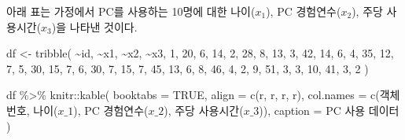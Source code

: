 \documentclass[
]{book}
\newenvironment{Shaded}{\begin{snugshade}}{\end{snugshade}}
\newcommand{\AttributeTok}[1]{\textcolor[rgb]{0.77,0.63,0.00}{#1}}
\newcommand{\ConstantTok}[1]{\textcolor[rgb]{0.00,0.00,0.00}{#1}}
\newcommand{\DecValTok}[1]{\textcolor[rgb]{0.00,0.00,0.81}{#1}}
\newcommand{\FunctionTok}[1]{\textcolor[rgb]{0.00,0.00,0.00}{#1}}
\newcommand{\NormalTok}[1]{#1}
\newcommand{\OtherTok}[1]{\textcolor[rgb]{0.56,0.35,0.01}{#1}}
\newcommand{\SpecialCharTok}[1]{\textcolor[rgb]{0.00,0.00,0.00}{#1}}
\newcommand{\StringTok}[1]{\textcolor[rgb]{0.31,0.60,0.02}{#1}}
\begin{document}
아래 표는 가정에서 PC를 사용하는 10명에 대한 나이(\(x_1\)), PC 경험연수(\(x_2\)), 주당 사용시간(\(x_3\))을 나타낸 것이다.

\begin{Shaded}
\begin{Highlighting}[]
\NormalTok{df }\OtherTok{\textless{}{-}} \FunctionTok{tribble}\NormalTok{(}
  \SpecialCharTok{\textasciitilde{}}\NormalTok{id, }\SpecialCharTok{\textasciitilde{}}\NormalTok{x1, }\SpecialCharTok{\textasciitilde{}}\NormalTok{x2, }\SpecialCharTok{\textasciitilde{}}\NormalTok{x3,}
  \DecValTok{1}\NormalTok{, }\DecValTok{20}\NormalTok{, }\DecValTok{6}\NormalTok{, }\DecValTok{14}\NormalTok{,}
  \DecValTok{2}\NormalTok{, }\DecValTok{28}\NormalTok{, }\DecValTok{8}\NormalTok{, }\DecValTok{13}\NormalTok{,}
  \DecValTok{3}\NormalTok{, }\DecValTok{42}\NormalTok{, }\DecValTok{14}\NormalTok{, }\DecValTok{6}\NormalTok{,}
  \DecValTok{4}\NormalTok{, }\DecValTok{35}\NormalTok{, }\DecValTok{12}\NormalTok{, }\DecValTok{7}\NormalTok{,}
  \DecValTok{5}\NormalTok{, }\DecValTok{30}\NormalTok{, }\DecValTok{15}\NormalTok{, }\DecValTok{7}\NormalTok{,}
  \DecValTok{6}\NormalTok{, }\DecValTok{30}\NormalTok{, }\DecValTok{7}\NormalTok{, }\DecValTok{15}\NormalTok{,}
  \DecValTok{7}\NormalTok{, }\DecValTok{45}\NormalTok{, }\DecValTok{13}\NormalTok{, }\DecValTok{6}\NormalTok{,}
  \DecValTok{8}\NormalTok{, }\DecValTok{46}\NormalTok{, }\DecValTok{4}\NormalTok{, }\DecValTok{2}\NormalTok{,}
  \DecValTok{9}\NormalTok{, }\DecValTok{51}\NormalTok{, }\DecValTok{3}\NormalTok{, }\DecValTok{3}\NormalTok{,}
  \DecValTok{10}\NormalTok{, }\DecValTok{41}\NormalTok{, }\DecValTok{3}\NormalTok{, }\DecValTok{2}
\NormalTok{)}

\NormalTok{df }\SpecialCharTok{\%\textgreater{}\%}
\NormalTok{  knitr}\SpecialCharTok{::}\FunctionTok{kable}\NormalTok{(}
    \AttributeTok{booktabs =} \ConstantTok{TRUE}\NormalTok{,}
    \AttributeTok{align =} \FunctionTok{c}\NormalTok{(}\StringTok{\textquotesingle{}r\textquotesingle{}}\NormalTok{, }\StringTok{\textquotesingle{}r\textquotesingle{}}\NormalTok{, }\StringTok{\textquotesingle{}r\textquotesingle{}}\NormalTok{, }\StringTok{\textquotesingle{}r\textquotesingle{}}\NormalTok{),}
    \AttributeTok{col.names =} \FunctionTok{c}\NormalTok{(}\StringTok{\textquotesingle{}객체번호\textquotesingle{}}\NormalTok{, }\StringTok{\textquotesingle{}나이($x\_1$)\textquotesingle{}}\NormalTok{, }\StringTok{\textquotesingle{}PC 경험연수($x\_2$)\textquotesingle{}}\NormalTok{, }\StringTok{\textquotesingle{}주당 사용시간($x\_3$)\textquotesingle{}}\NormalTok{),}
    \AttributeTok{caption =} \StringTok{\textquotesingle{}PC 사용 데이터\textquotesingle{}}
\NormalTok{  )}
\end{Highlighting}
\end{Shaded}
\end{document}

